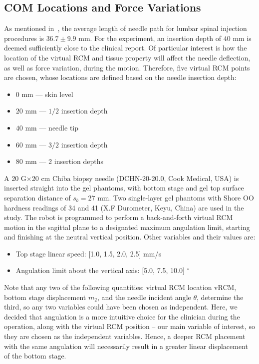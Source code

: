 \subsection{COM Locations and Force Variations} 
\label{sec:chap-2-com-and-force}
As mentioned in~\parencite{fritzAugmentedRealityVisualization2012}, the average length of needle path for lumbar spinal injection procedures is $36.7\pm9.9$ mm. For the experiment, an insertion depth of $40$ mm is deemed sufficiently close to the clinical report. Of particular interest is how the location of the virtual RCM and tissue property will affect the needle deflection, as well as force variation, during the motion. Therefore, five virtual RCM points are chosen, whose locations are defined based on the needle insertion depth:

\begin{itemize}
  \item $0$ mm --- skin level
  \item $20$ mm --- $1/2$ insertion depth
  \item $40$ mm --- needle tip
  \item $60$ mm --- $3/2$ insertion depth
  \item $80$ mm --- 2 insertion depths
\end{itemize}

A 20 G$\times$20 cm Chiba biopsy needle (DCHN-20-20.0, Cook Medical, USA) is inserted straight into the gel phantoms, with bottom stage and gel top surface separation distance of $s_b = 27$ mm. Two single-layer gel phantoms with Shore OO hardness readings of 34 and 41 (X.F Durometer, Keyu, China) are used in the study. The robot is programmed to perform a back-and-forth virtual RCM motion in the sagittal plane to a designated maximum angulation limit, starting and finishing at the neutral vertical position. Other variables and their values are:

\begin{itemize}
  \item Top stage linear speed: [1.0, 1.5, 2.0, 2.5] mm/s
  \item Angulation limit about the vertical axis: [5.0, 7.5, 10.0] $^\circ$
\end{itemize}


Note that any two of the following quantities: virtual RCM location vRCM, bottom stage displacement $m_2$, and the needle incident angle $\theta$, determine the third, so any two variables could have been chosen as independent. Here, we decided that angulation is a more intuitive choice for the clinician during the operation, along with the virtual RCM position -- our main variable of interest, so they are chosen as the independent variables. Hence, a deeper RCM placement with the same angulation will necessarily result in a greater linear displacement of the bottom stage.


